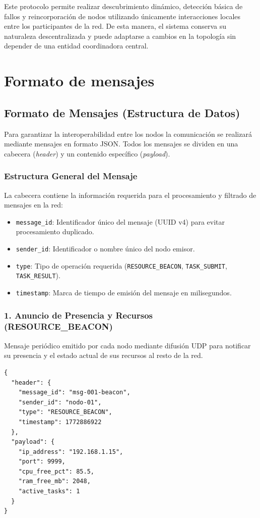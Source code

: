 \documentclass{article}
\begin{document}
Este protocolo permite realizar descubrimiento dinámico, detección básica de fallos y reincorporación de nodos utilizando únicamente interacciones locales entre los participantes de la red. De esta manera, el sistema conserva su naturaleza descentralizada y puede adaptarse a cambios en la topología sin depender de una entidad coordinadora central.

\section{Formato de mensajes}

\subsection{Formato de Mensajes (Estructura de Datos)}
Para garantizar la interoperabilidad entre los nodos la comunicación se realizará mediante mensajes en formato JSON. Todos los mensajes se dividen en una cabecera (\textit{header}) y un contenido específico (\textit{payload}).

\subsubsection{Estructura General del Mensaje}
La cabecera contiene la información requerida para el procesamiento y filtrado de mensajes en la red:
\begin{itemize}
    \item \texttt{message\_id}: Identificador único del mensaje (UUID v4) para evitar procesamiento duplicado.
    \item \texttt{sender\_id}: Identificador o nombre único del nodo emisor.
    \item \texttt{type}: Tipo de operación requerida (\texttt{RESOURCE\_BEACON}, \texttt{TASK\_SUBMIT}, \texttt{TASK\_RESULT}).
    \item \texttt{timestamp}: Marca de tiempo de emisión del mensaje en milisegundos.
\end{itemize}

\subsubsection{1. Anuncio de Presencia y Recursos (RESOURCE\_BEACON)}
Mensaje periódico emitido por cada nodo mediante difusión UDP para notificar su presencia y el estado actual de sus recursos al resto de la red.

\begin{lstlisting}[caption={Mensaje JSON para anuncio de recursos}]
{
  "header": {
    "message_id": "msg-001-beacon",
    "sender_id": "nodo-01",
    "type": "RESOURCE_BEACON",
    "timestamp": 1772886922
  },
  "payload": {
    "ip_address": "192.168.1.15",
    "port": 9999,
    "cpu_free_pct": 85.5,
    "ram_free_mb": 2048,
    "active_tasks": 1
  }
}
\end{lstlisting}
\end{document}
